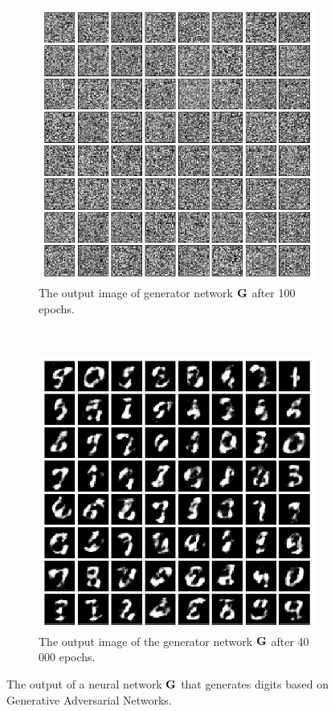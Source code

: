 \documentclass[../main.tex]{subfiles}
\begin{document}
\begin{figure}
    \centering
    \begin{subfigure}[b]{0.48\textwidth}
    	\centering
	    \includegraphics[width=\textwidth]{figures/wgan/0000000000}
	    \caption{The output image of generator network $\mathbf{G}$ after 100 epochs.}
	    \label{fig:100epochs}
    \end{subfigure}
    ~
    \begin{subfigure}[b]{0.48\textwidth}
    	\centering
        \includegraphics[width=\textwidth]{figures/wgan/0000039000}
        \caption{The output image of the generator network $\mathbf{G}$ after 40 000 epochs.}
        \label{fig:lastepochs}
    \end{subfigure}
    \caption{The output of a neural network $\mathbf{G}$ that generates digits based on Generative Adversarial Networks.} \label{fig:pix}
\end{figure}
\end{document}

